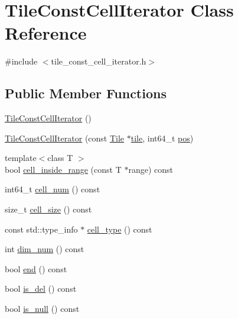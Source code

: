 \hypertarget{classTileConstCellIterator}{}\section{Tile\+Const\+Cell\+Iterator Class Reference}
\label{classTileConstCellIterator}


{\ttfamily \#include $<$tile\+\_\+const\+\_\+cell\+\_\+iterator.\+h$>$}

\subsection*{Public Member Functions}
\begin{DoxyCompactItemize}
\item 
\hyperlink{classTileConstCellIterator_ad534b9d3ac4c98bb764cbde78bf84b18}{Tile\+Const\+Cell\+Iterator} ()
\item 
\hyperlink{classTileConstCellIterator_a5c4344e2bdbddf859655baaf11bf2341}{Tile\+Const\+Cell\+Iterator} (const \hyperlink{classTile}{Tile} $\ast$\hyperlink{classTileConstCellIterator_ada2161284f63d76b6e21762d8151875a}{tile}, int64\+\_\+t \hyperlink{classTileConstCellIterator_aa39b091d9a4843b1d9b6d24d0f5874be}{pos})
\item 
{\footnotesize template$<$class T $>$ }\\bool \hyperlink{classTileConstCellIterator_aee04c64cf4d0532f64b9b2ec219377e6}{cell\+\_\+inside\+\_\+range} (const T $\ast$range) const 
\item 
int64\+\_\+t \hyperlink{classTileConstCellIterator_af3ec2a67631a52193b90808981b7eb2c}{cell\+\_\+num} () const 
\item 
size\+\_\+t \hyperlink{classTileConstCellIterator_ab6847b9b67934e8bcf728019bdb3c23a}{cell\+\_\+size} () const 
\item 
const std\+::type\+\_\+info $\ast$ \hyperlink{classTileConstCellIterator_a0e4c133d6cd7a4c64eb31c3e130b5cd9}{cell\+\_\+type} () const 
\item 
int \hyperlink{classTileConstCellIterator_a78e2eea52b6b3e30226cd38f6a564d3e}{dim\+\_\+num} () const 
\item 
bool \hyperlink{classTileConstCellIterator_a8db27d6ce164a2aeedf273466d4d3877}{end} () const 
\item 
bool \hyperlink{classTileConstCellIterator_a701e1a9f1c38b893b7a36b57e1b51944}{is\+\_\+del} () const 
\item 
bool \hyperlink{classTileConstCellIterator_a60299d207486501cb60231da30735e26}{is\+\_\+null} () const 

\end{DoxyCompactItemize}
